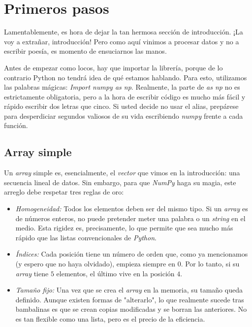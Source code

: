 \section{Primeros pasos}

Lamentablemente, es hora de dejar la tan hermosa sección de introducción. ¡La voy a extrañar, introducción! Pero como aquí vinimos a procesar datos y no a escribir poesía, es momento de ensuciarnos las manos.

Antes de empezar como locos, hay que importar la librería, porque de lo contrario Python no tendrá idea de qué estamos hablando. Para esto, utilizamos las palabras mágicas: \textit{{\color{red}Import} numpy {\color{red}as} np}. Realmente, la parte de \textit{as np} no es estrictamente obligatoria, pero a la hora de escribir código es mucho más fácil y rápido escribir dos letras que cinco. Si usted decide no usar el alias, prepárese para desperdiciar segundos valiosos de su vida escribiendo \textit{numpy} frente a cada función.

\subsection{Array simple}

Un \textit{array} simple es, esencialmente, el \textit{vector} que vimos en la introducción: una secuencia lineal de datos. Sin embargo, para que \textit{NumPy} haga su magia, este arreglo debe respetar tres reglas de oro:

\begin{itemize}
    \item \textit{Homogeneidad:} Todos los elementos deben ser del mismo tipo. Si un \textit{array} es de números enteros, no puede pretender meter una palabra o un \textit{string} en el medio. Esta rigidez es, precisamente, lo que permite que sea mucho más rápido que las listas convencionales de \textit{Python}.
    \item \textit{Índices:} Cada posición tiene un número de orden que, como ya mencionamos (y espero que no haya olvidado), empieza siempre en \(0\). Por lo tanto, si su \textit{array} tiene \(5\) elementos, el último vive en la posición \(4\).
    \item \textit{Tamaño fijo:} Una vez que se crea el \textit{array} en la memoria, su tamaño queda definido. Aunque existen formas de "alterarlo", lo que realmente sucede tras bambalinas es que se crean copias modificadas y se borran las anteriores. No es tan flexible como una lista, pero es el precio de la eficiencia.
\end{itemize}

